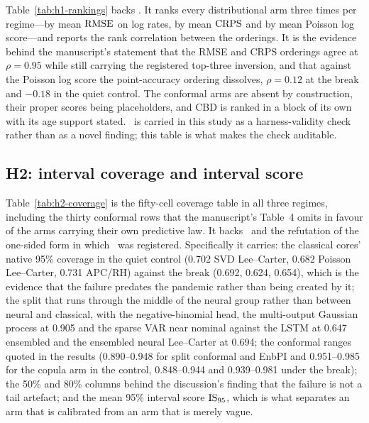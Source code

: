 Table~\ref{tab:h1-rankings} backs \Hone. It ranks every distributional arm
three times per regime---by mean $\operatorname{RMSE}$ on log rates, by mean $\operatorname{CRPS}$ and by
mean Poisson log score---and reports the rank correlation between the
orderings. It is the evidence behind the manuscript's statement that the RMSE
and CRPS orderings agree at $\rho = 0.95$ while still carrying the registered
top-three inversion, and that against the Poisson log score the point-accuracy
ordering dissolves, $\rho = 0.12$ at the break and $-0.18$ in the quiet
control. The conformal arms are absent by construction, their proper scores
being placeholders, and CBD is ranked in a block of its own with its age
support stated. \Hone\ is carried in this study as a harness-validity check
rather than as a novel finding; this table is what makes the check auditable.


\subsection{H2: interval coverage and interval score}

Table~\ref{tab:h2-coverage} is the fifty-cell coverage table in all three
regimes, including the thirty conformal rows that the manuscript's Table~4
omits in favour of the arms carrying their own predictive law. It backs \Htwo\
and the refutation of the one-sided form in which \Htwo\ was registered.
Specifically it carries: the classical cores' native 95\% coverage in the quiet
control (0.702 SVD Lee--Carter, 0.682 Poisson Lee--Carter, 0.731 APC/RH)
against the break (0.692, 0.624, 0.654), which is the evidence that the failure
predates the pandemic rather than being created by it; the split that runs
through the middle of the neural group rather than between neural and
classical, with the negative-binomial head, the multi-output Gaussian process
at 0.905 and the sparse VAR near nominal against the LSTM at 0.647 ensembled
and the ensembled neural Lee--Carter at 0.694; the conformal ranges quoted in
the results (0.890--0.948 for split conformal and EnbPI and 0.951--0.985 for
the copula arm in the control, 0.848--0.944 and 0.939--0.981 under the break);
the 50\% and 80\% columns behind the discussion's finding that the failure is
not a tail artefact; and the mean 95\% interval score $\operatorname{IS}_{95}$, which is what
separates an arm that is calibrated from an arm that is merely vague.


